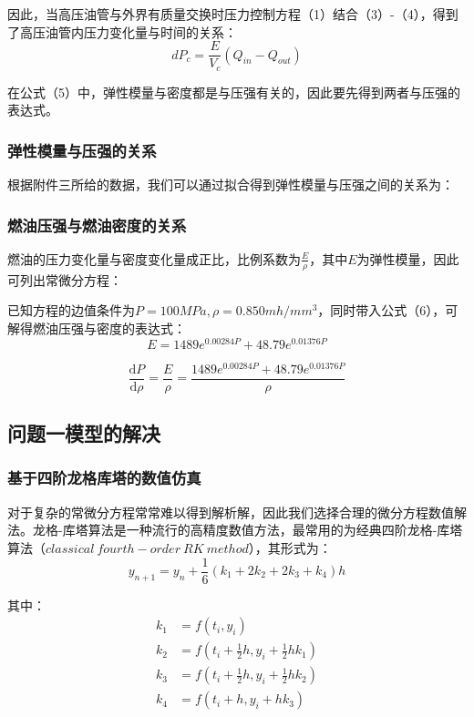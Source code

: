\documentclass[withoutpreface,bwprint]{cumcmthesis} %
\begin{document}
因此，当高压油管与外界有质量交换时压力控制方程（1）结合（3）-（4），得到了高压油管内压力变化量与时间的关系：
\begin{equation}
	dP_c = \frac{E}{V_c}(Q_{in} - Q_{out})
\end{equation}

在公式（5）中，弹性模量与密度都是与压强有关的，因此要先得到两者与压强的表达式。
\subsubsection{弹性模量与压强的关系}
根据附件三所给的数据，我们可以通过拟合得到弹性模量与压强之间的关系为：

\subsubsection{燃油压强与燃油密度的关系}
燃油的压力变化量与密度变化量成正比，比例系数为$\frac{E}{\rho}$，其中$E$为弹性模量，因此可列出常微分方程：

已知方程的边值条件为$P = 100MPa, \rho = 0.850 mh/mm^3$，同时带入公式（6），可解得燃油压强与密度的表达式：
\begin{equation}
E = 1489 e^{0.00284P} + 48.79 e^{0.01376 P}
\end{equation}

\begin{equation}
\frac{\mathrm{d}P}{\mathrm{d}\rho} = \frac{E}{\rho} = \frac{1489 e^{0.00284P} + 48.79 e^{0.01376 P}}{\rho}
\end{equation}

\subsection{问题一模型的解决}
\subsubsection{基于四阶龙格库塔的数值仿真}
对于复杂的常微分方程常常难以得到解析解，因此我们选择合理的微分方程数值解法。龙格-库塔算法是一种流行的高精度数值方法，最常用的为经典四阶龙格-库塔算法（$classical\ fourth-order\ RK\ method$），其形式为：
\[
y_{n+1}=y_{n}+\frac{1}{6}(k_{1}+2k_{2}+2k_{3}+k_{4})h
\]

其中：
\begin{align*}
k_{1}&=f(t_{i},y_{i})\\
k_{2}&=f(t_{i}+\frac{1}{2}h,y_{i}+\frac{1}{2}hk_{1})\\
k_{3}&=f(t_{i}+\frac{1}{2}h,y_{i}+\frac{1}{2}hk_{2})\\
k_{4}&=f(t_{i}+h,y_{i}+hk_{3})
\end{align*}
\end{document}
